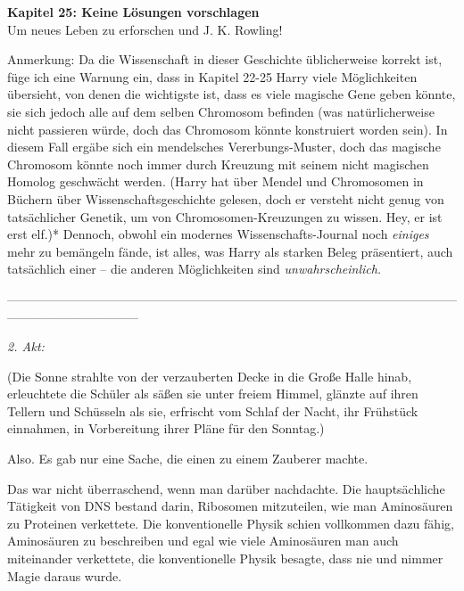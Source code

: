 

\hypertarget{keine-luxf6sungen-vorschlagen}{%

\textbf{Kapitel 25: Keine Lösungen vorschlagen}\\

Um neues Leben zu erforschen und J. K. Rowling!

Anmerkung: Da die Wissenschaft in dieser Geschichte üblicherweise korrekt ist, füge ich eine Warnung ein, dass in Kapitel 22-25 Harry viele Möglichkeiten übersieht, von denen die wichtigste ist, dass es viele magische Gene geben könnte, sie sich jedoch alle auf dem selben Chromosom befinden (was natürlicherweise nicht passieren würde, doch das Chromosom könnte konstruiert worden sein). In diesem Fall ergäbe sich ein mendelsches Vererbungs-Muster, doch das magische Chromosom könnte noch immer durch Kreuzung mit seinem nicht magischen Homolog geschwächt werden. (Harry hat über Mendel und Chromosomen in Büchern über Wissenschaftsgeschichte gelesen, doch er versteht nicht genug von tatsächlicher Genetik, um von Chromosomen-Kreuzungen zu wissen. Hey, er ist erst elf.)* Dennoch, obwohl ein modernes Wissenschafts-Journal noch \emph{einiges} mehr zu bemängeln fände, ist alles, was Harry als starken Beleg präsentiert, auch tatsächlich einer -- die anderen Möglichkeiten sind \emph{unwahrscheinlich.}

--------------------------------------------------------------------------------------------------------------------------------------------

\emph{2. Akt:}

(Die Sonne strahlte von der verzauberten Decke in die Große Halle hinab, erleuchtete die Schüler als säßen sie unter freiem Himmel, glänzte auf ihren Tellern und Schüsseln als sie, erfrischt vom Schlaf der Nacht, ihr Frühstück einnahmen, in Vorbereitung ihrer Pläne für den Sonntag.)

Also. Es gab nur eine Sache, die einen zu einem Zauberer machte.

Das war nicht überraschend, wenn man darüber nachdachte. Die hauptsächliche Tätigkeit von DNS bestand darin, Ribosomen mitzuteilen, wie man Aminosäuren zu Proteinen verkettete. Die konventionelle Physik schien vollkommen dazu fähig, Aminosäuren zu beschreiben und egal wie viele Aminosäuren man auch miteinander verkettete, die konventionelle Physik besagte, dass nie und nimmer Magie daraus wurde.

}
